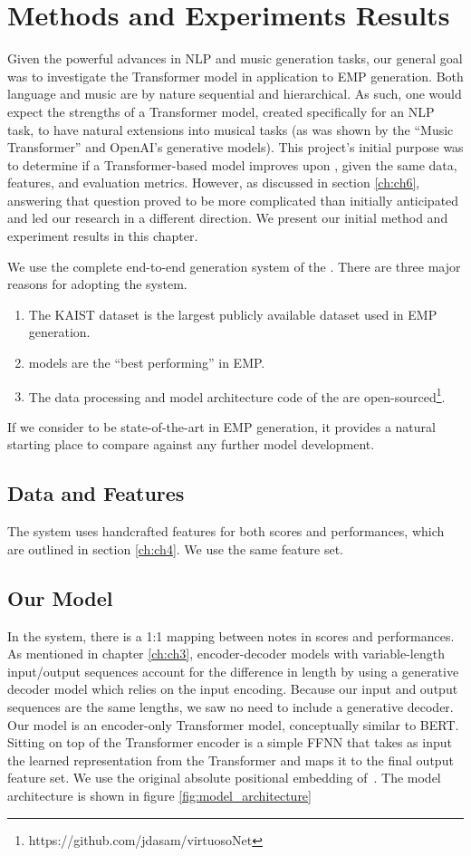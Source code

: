 \chapter{Methods and Experiments Results}\label{ch:ch5}
Given the powerful advances in NLP and music generation tasks, our general goal was to investigate the Transformer model in application to EMP generation. Both language and music are by nature sequential and hierarchical. As such, one would expect the strengths of a Transformer model, created specifically for an NLP task, to have natural extensions into musical tasks (as was shown by the ``Music Transformer'' and OpenAI's generative models).  This project's initial purpose was to determine if a Transformer-based model improves upon \vnet{}, given the same data, features, and evaluation metrics. However, as discussed in section \ref{ch:ch6}, answering that question proved to be more complicated than initially anticipated and led our research in a different direction. We present our initial method and experiment results in this chapter. 

We use the complete end-to-end generation system of the \vnetf{}. There are three major reasons for adopting the \vnet{} system. 
\begin{enumerate}
    \item The KAIST dataset is the largest publicly available dataset used in EMP generation.
    \item \vnet{} models are the ``best performing'' in EMP.
    \item The data processing and model architecture code of the \vnetf{} are open-sourced\footnote{https://github.com/jdasam/virtuosoNet}.
\end{enumerate}
If we consider \vnet{} to be state-of-the-art in EMP generation, it provides a natural starting place to compare against any further model development. 

\section{Data and Features}
The \vnet{} system uses handcrafted features for both scores and performances, which are outlined in section \ref{ch:ch4}. We use the same feature set.

\section{Our Model}
In the \vnet{} system, there is a 1:1 mapping between notes in scores and performances. As mentioned in chapter \ref{ch:ch3}, encoder-decoder \seq{} models with variable-length input/output sequences account for the difference in length by using a generative decoder model which relies on the input encoding. Because our input and output sequences are the same lengths, we saw no need to include a generative decoder. Our model is an encoder-only Transformer model, conceptually similar to BERT. Sitting on top of the Transformer encoder is a simple FFNN that takes as input the learned representation from the Transformer and maps it to the final output feature set. We use the original absolute positional embedding of~\citet{vaswani2017attention}. The model architecture is shown in figure \ref{fig:model_architecture}

